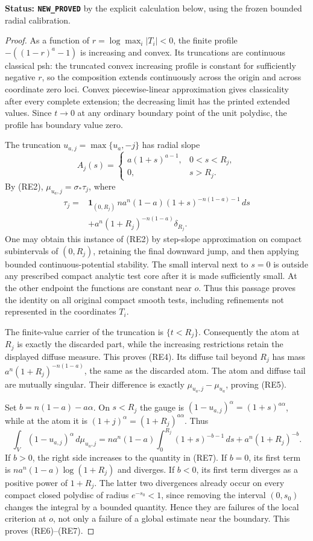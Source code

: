 \documentclass[11pt,a4paper]{article}
\numberwithin{equation}{section}
\theoremstyle{definition}
\theoremstyle{remark}
\begin{document}
\noindent\textbf{Status: \texttt{NEW\_PROVED}} by the explicit
calculation below, using the frozen bounded radial calibration.

\begin{proof}
As a function of $r=\log\max_i|T_i|<0$, the finite profile
$-((1-r)^a-1)$ is increasing and convex. Its truncations are
continuous classical psh: the truncated convex increasing profile
is constant for sufficiently negative $r$, so the composition
extends continuously across the origin and across coordinate
zero loci. Convex piecewise-linear approximation gives classicality
after every complete extension; the decreasing limit has the
printed extended values. Since $t\to0$ at any ordinary boundary
point of the unit polydisc, the profile has boundary value zero.

The truncation $u_{a,j}=\max\{u_a,-j\}$ has radial slope
\[
 A_j(s)=
 \begin{cases}
 a(1+s)^{a-1},&0<s<R_j,\\
 0,&s>R_j.
 \end{cases}
\]
By (RE2), $\mu_{u_a,j}=\sigma_*\tau_j$, where
\[
 \begin{split}
 \tau_j={}&
   \mathbf1_{(0,R_j)}\,
        n a^n(1-a)(1+s)^{-n(1-a)-1}\,ds\\
 &+a^n(1+R_j)^{-n(1-a)}\delta_{R_j}.
 \end{split}
 \tag{RE8}
\]
One may obtain this instance of (RE2) by step-slope approximation
on compact subintervals of $(0,R_j)$, retaining the final downward
jump, and then applying bounded continuous-potential stability.
The small interval next to $s=0$ is outside any prescribed compact
analytic test core after it is made sufficiently small. At the
other endpoint the functions are constant near $o$. Thus this
passage proves the identity on all original compact smooth tests,
including refinements not represented in the coordinates $T_i$.

The finite-value carrier of the truncation is $\{t<R_j\}$.
Consequently the atom at $R_j$ is exactly the discarded part,
while the increasing restrictions retain the displayed diffuse
measure. This proves (RE4). Its diffuse tail beyond $R_j$ has
mass $a^n(1+R_j)^{-n(1-a)}$, the same as the discarded atom.
The atom and diffuse tail are mutually singular. Their difference
is exactly $\mu_{u_a,j}-\mu_{u_a}$, proving (RE5).

Set $b=n(1-a)-a\alpha$. On $s<R_j$ the gauge is
$(1-u_{a,j})^\alpha=(1+s)^{a\alpha}$, while at the atom
it is $(1+j)^\alpha=(1+R_j)^{a\alpha}$. Thus
\[
 \int_V(1-u_{a,j})^\alpha\,d\mu_{u_a,j}
   =n a^n(1-a)\int_0^{R_j}(1+s)^{-b-1}\,ds
          +a^n(1+R_j)^{-b}.
 \tag{RE9}
\]
If $b>0$, the right side increases to the quantity in (RE7).
If $b=0$, its first term is
$n a^n(1-a)\log(1+R_j)$ and diverges. If $b<0$, its
first term diverges as a positive power of $1+R_j$.
The latter two divergences already occur on every compact closed
polydisc of radius $e^{-s_0}<1$, since removing the interval
$(0,s_0)$ changes the integral by a bounded quantity. Hence they
are failures of the local criterion at $o$, not only a failure
of a global estimate near the boundary. This proves (RE6)--(RE7).
\end{proof}
\end{document}
